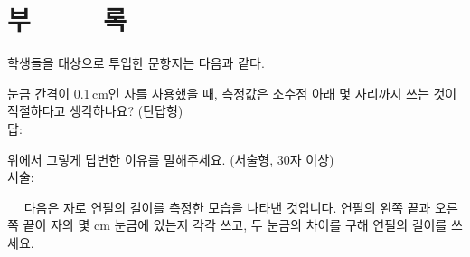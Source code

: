 \chapter*{부 ~ ~ ~록}\label{chap:appendix}
\vspace*{4em}
\anset

학생들을 대상으로 투입한 문항지는 다음과 같다. \\


\bnset
\begin{graybox}\centering
{\fontsize{14pt}{17pt}\selectfont\bd{\an
\ItemTitlei
}}\vspace*{0.8em}\end{graybox}\vspace{0.4em}

\begin{graybox}\vspace*{0.2em}\bn
눈금 간격이 0.1\,cm인 자를 사용했을 때, 측정값은 소수점 아래 몇 자리까지 쓰는 것이
적절하다고 생각하나요?
(단답형) \\ 답: 
\vspace*{0.4em}\end{graybox}\vspace{0.4em}

\begin{graybox}\vspace*{0.2em}\bn
위에서 그렇게 답변한 이유를 말해주세요.
(서술형, 30자 이상) \\ 서술: 
\vspace*{2.4em}\end{graybox}\vspace{0.4em}


\clearpage


\bnset
\begin{graybox}\centering
{\fontsize{14pt}{17pt}\selectfont\bd{\an
\ItemTitleii
}}\vspace*{0.8em}\end{graybox}\vspace{0.4em}

\begin{graybox}
~~ 다음은 자로 연필의 길이를 측정한 모습을 나타낸 것입니다. 연필의 왼쪽 끝과 오른쪽 끝이
자의 몇 cm 눈금에 있는지 각각 쓰고, 두 눈금의 차이를 구해 연필의 길이를 쓰세요.
\end{graybox}\vspace{0.4em}

